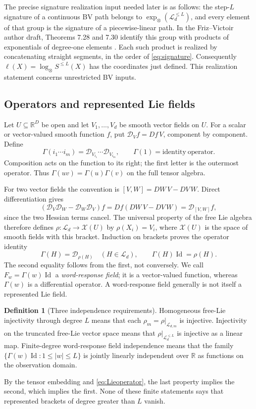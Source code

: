 \documentclass[11pt,a4paper]{article}
\numberwithin{equation}{section}
\theoremstyle{definition}
\newtheorem{definition}[theorem]{Definition}
\theoremstyle{remark}
\DeclareMathOperator{\Id}{Id}
\newcommand{\R}{\mathbb R}
\newcommand{\Lie}{\mathcal L}
\newcommand{\Dop}{\mathcal D}
\begin{document}
The precise signature realization input needed later is as follows: the
step-$L$ signature of a continuous BV path belongs to
$\exp_\otimes(\Lie_d^{\leq L})$, and every element of that group is the
signature of a piecewise-linear path. In the Friz--Victoir author draft,
Theorems 7.28 and 7.30 identify this group with products of exponentials of
degree-one elements \cite{FrizVictoir}. Each such product is realized by
concatenating straight segments, in the order of \eqref{eq:signature}.
Consequently $\ell(X)=\log_\otimes S^{\leq L}(X)$ has the coordinates just
defined. This realization statement concerns unrestricted BV inputs.

\subsection{Operators and represented Lie fields}
Let $U\subseteq\R^D$ be open and let $V_1,\ldots,V_d$ be smooth vector
fields on $U$. For a scalar or vector-valued smooth function $f$, put
$\Dop_Vf=Df\,V$, component by component. Define
\begin{equation}\label{eq:Gamma}
 \Gamma(i_1\cdots i_m)=\Dop_{V_{i_1}}\cdots\Dop_{V_{i_m}},
 \qquad \Gamma(1)=\mathrm{identity\ operator}.
\end{equation}
Composition acts on the function to its right; the first letter is the
outermost operator. Thus $\Gamma(uv)=\Gamma(u)\Gamma(v)$ on the full
tensor algebra.

For two vector fields the convention is
$[V,W]=DW\,V-DV\,W$. Direct differentiation gives
\[
 (\Dop_V\Dop_W-\Dop_W\Dop_V)f
 =Df(DW\,V-DV\,W)=\Dop_{[V,W]}f,
\]
since the two Hessian terms cancel. The universal property of the free Lie
algebra therefore defines $\rho:\Lie_d\to\mathcal X(U)$ by
$\rho(X_i)=V_i$, where $\mathcal X(U)$ is the space of smooth fields with
this bracket. Induction on brackets proves the operator identity
\begin{equation}\label{eq:Lieoperator}
 \Gamma(H)=\Dop_{\rho(H)}\quad(H\in\Lie_d),\qquad
 \Gamma(H)\Id=\rho(H).
\end{equation}
The second equality follows from the first, not conversely. We call
$F_w=\Gamma(w)\Id$ a \emph{word-response field}; it is a vector-valued
function, whereas $\Gamma(w)$ is a differential operator. A word-response
field generally is not itself a represented Lie field.

\begin{definition}[Three independence requirements]
Homogeneous free-Lie injectivity through degree $L$ means that each
$\rho_m=\rho|_{\Lie_{d,m}}$ is injective. Injectivity on the truncated
free-Lie vector space means that $\rho|_{\Lie_d^{\leq L}}$ is injective
as a linear map. Finite-degree word-response field independence means that
the family $\{\Gamma(w)\Id:1\leq|w|\leq L\}$ is jointly linearly
independent over $\R$ as functions on the observation domain.
\end{definition}
By the tensor embedding and \eqref{eq:Lieoperator}, the last property implies
the second, which implies the first. None of these finite statements says
that represented brackets of degree greater than $L$ vanish.
\end{document}
